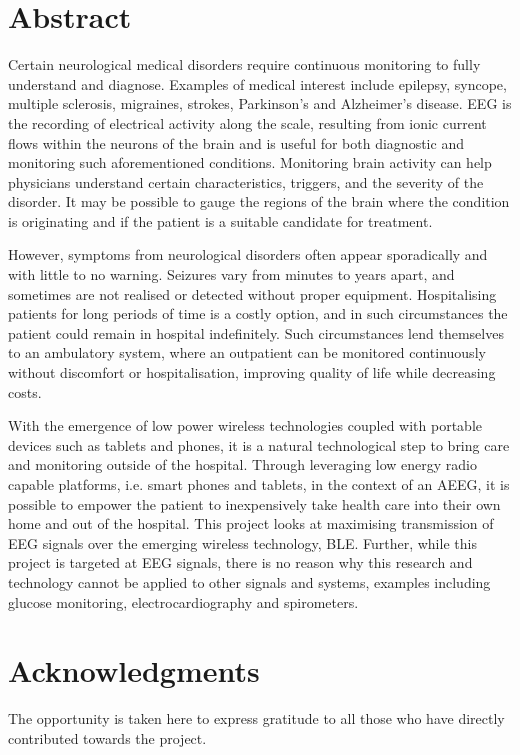 \documentclass[]{article}
\begin{document}
\clearpage

\section*{Abstract}
Certain neurological medical disorders require continuous monitoring to fully understand and diagnose. Examples of medical interest include epilepsy, syncope, multiple sclerosis, migraines, strokes, Parkinson’s and Alzheimer’s disease. \ac{EEG} is the recording of electrical activity along the scale, resulting from ionic current flows within the neurons of the brain and is useful for both diagnostic and monitoring such aforementioned conditions. Monitoring brain activity can help physicians understand certain characteristics, triggers, and the severity of the disorder. It may be possible to gauge the regions of the brain where the condition is originating and if the patient is a suitable candidate for treatment. 

However, symptoms from neurological disorders often appear sporadically and with little to no warning. Seizures vary from minutes to years apart, and sometimes are not realised or detected without proper equipment. Hospitalising patients for long periods of time is a costly option, and in such circumstances the patient could remain in hospital indefinitely.  Such circumstances lend themselves to an ambulatory system, where an outpatient can be monitored continuously without discomfort or hospitalisation, improving quality of life while decreasing costs. 

With the emergence of low power wireless technologies coupled with portable devices such as tablets and phones, it is a natural technological step to bring care and monitoring outside of the hospital. Through leveraging low energy radio capable platforms, i.e. smart phones and tablets, in the context of an \ac{AEEG}, it is possible to empower the patient to inexpensively take health care into their own home and out of the hospital. This project looks at maximising transmission of \ac{EEG} signals over the emerging wireless technology, \ac{BLE}. Further, while this project is targeted at \ac{EEG} signals, there is no reason why this research and technology cannot be applied to other signals and systems, examples including glucose monitoring, electrocardiography and spirometers.


\clearpage
\tableofcontents
\clearpage

\section{Acknowledgments}
\label{sec:Acknowledgments}
The opportunity is taken here to express gratitude to all those who have directly contributed towards the project. 
\end{document}
